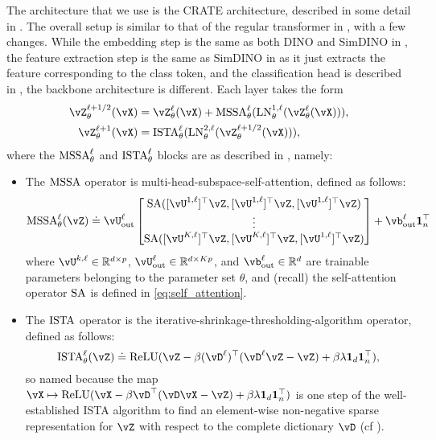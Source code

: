 \documentclass[../../book-main.tex]{subfiles}
\begin{document}
The architecture that we use is the CRATE architecture, described in some detail in . The overall setup is similar to that of the regular transformer in , with a few changes. While the embedding step is the same as both DINO and SimDINO in , the feature extraction step is the same as SimDINO in  as it just extracts the feature corresponding to the class token, and the classification head is described in , the backbone architecture is different. Each layer takes the form
\begin{align}\label{eq:CARTE updates}
    \vZ_{\theta}^{\ell + 1/2}(\vX)
    &= \vZ_{\theta}^{\ell}(\vX) + \MSSA_{\theta}^{\ell}(\LN_{\theta}^{1, \ell}(\vZ_{\theta}^{\ell}(\vX))), \\ 
    \vZ_{\theta}^{\ell + 1}(\vX)
    &= \ISTA_{\theta}^{\ell}(\LN_{\theta}^{2, \ell}(\vZ_{\theta}^{\ell + 1/2}(\vX))),
\end{align}
where the \(\operatorname{MSSA}_{\theta}^{\ell}\) and \(\operatorname{ISTA}_{\theta}^{\ell}\) blocks are as described in , namely:
\begin{itemize}
    \item The \(\operatorname{MSSA}\) operator is multi-head-subspace-self-attention, defined as follows:
    \begin{equation}
        \MSSA_{\theta}^{\ell}(\vZ) \doteq \vU_{\out}^{\ell}\mat{\SA([\vU^{1, \ell}]^{\top}\vZ, [\vU^{1, \ell}]^{\top}\vZ, [\vU^{1, \ell}]^{\top}\vZ)\\ \vdots \\ \SA([\vU^{K, \ell}]^{\top}\vZ, [\vU^{K, \ell}]^{\top}\vZ, [\vU^{1, \ell}]^{\top}\vZ)} + \vb_{\out}^{\ell}\vone_{n}^{\top}
    \end{equation}
    where \(\vU^{k, \ell} \in \R^{d \times p}\), \(\vU_{\out}^{\ell} \in \R^{d \times Kp}\), and \(\vb_{\out}^{\ell} \in \R^{d}\) are trainable parameters belonging to the parameter set \(\theta\), and (recall) the self-attention operator \(\operatorname{SA}\) is defined in \eqref{eq:self_attention}.
    \item The \(\operatorname{ISTA}\) operator is the iterative-shrinkage-thresholding-algorithm operator, defined as follows:
    \begin{equation}
        \ISTA_{\theta}^{\ell}(\vZ) \doteq \ReLU(\vZ - \beta (\vD^{\ell})^{\top}(\vD^{\ell}\vZ - \vZ) + \beta\lambda \vone_{d}\vone_{n}^{\top}),
    \end{equation}
    so named because the map \(\vX \mapsto \ReLU(\vX - \beta \vD^{\top}(\vD\vX - \vZ) + \beta  \lambda \vone_{d}\vone_{n}^{\top})\) is one step of the well-established ISTA algorithm to find an element-wise non-negative sparse representation for \(\vZ\) with respect to the complete dictionary \(\vD\) (cf ).
\end{itemize}
\end{document}
